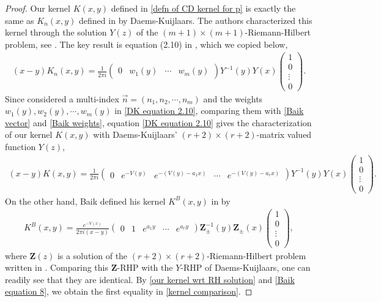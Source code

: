 \documentclass[a4paper,10pt,leqno]{amsart}
\numberwithin{equation}{section}
\theoremstyle{remark}
\begin{document}
\begin{proof}
Our kernel $K(x,y)$ defined in \eqref{defn of CD kernel for p} is exactly the same as $K_n(x,y)$ defined in \cite[Equation (1.8)]{DaemsKuijlaars2004} by Daems-Kuijlaars. The authors characterized this kernel through the solution $Y(z)$ of the $(m+1) \times (m+1)$-Riemann-Hilbert problem, see \cite[Section 2]{DaemsKuijlaars2004}. The key result is equation (2.10) in \cite{DaemsKuijlaars2004}, which we copied below,
\begin{align} \label{DK equation 2.10}
    (x - y) K_n(x, y) = \frac{1}{2\pi i} \begin{pmatrix}
        0 & w_1(y) & \cdots & w_m(y)
    \end{pmatrix} Y^{-1}(y) Y(x) \begin{pmatrix}
        1\\
        0\\
        \vdots\\
        0
    \end{pmatrix}.
\end{align}
Since \cite{DaemsKuijlaars2004} considered a multi-index $\vec{n} = (n_1, n_2, \cdots, n_m)$ and the weights $w_1(y), w_2(y), \cdots, w_m(y)$ in \eqref{DK equation 2.10}, comparing them with \eqref{Baik vector} and \eqref{Baik weights}, equation \eqref{DK equation 2.10} gives the characterization of our kernel $K(x, y)$ with Daems-Kuijlaars' $(r+2) \times (r+2)$-matrix valued function $Y(z)$,
\begin{align} \label{our kernel wrt RH solution}
    (x - y) K(x, y) = \frac{1}{2\pi i} \begin{pmatrix}
        0 & e^{-V(y)} & e^{-(V(y)-a_1x)} & \cdots & e^{-(V(y)-a_rx)}
    \end{pmatrix} Y^{-1}(y) Y(x) \begin{pmatrix}
        1\\
        0\\
        \vdots\\
        0
    \end{pmatrix}.
\end{align}
On the other hand, Baik defined his kernel $K^B(x,y)$ in \cite[Equation (8)]{Bai09} by
\begin{align} \label{Baik equation 8}
    K^B(x, y) = \frac{e^{-V(x)}}{2 \pi i (x-y)} \begin{pmatrix}
        0 & 1 & e^{a_1 y} & \cdots & e^{a_r y}
    \end{pmatrix} \mathbf{Z}_{\pm}^{-1}(y) \mathbf{Z}_{\pm}(x) \begin{pmatrix}
        1\\
        0\\
        \vdots\\
        0
    \end{pmatrix},
\end{align}
where $\mathbf{Z}(z)$ is a solution of the $(r+2)\times(r+2)$-Riemann-Hilbert problem written in \cite[pages 2-3]{Bai09}. Comparing this $\mathbf{Z}$-RHP with the $Y$-RHP of Daems-Kuijlaars, one can readily see that they are identical. By \eqref{our kernel wrt RH solution} and \eqref{Baik equation 8}, we obtain the first equality in \eqref{kernel comparison}.


\end{proof}
\end{document}
